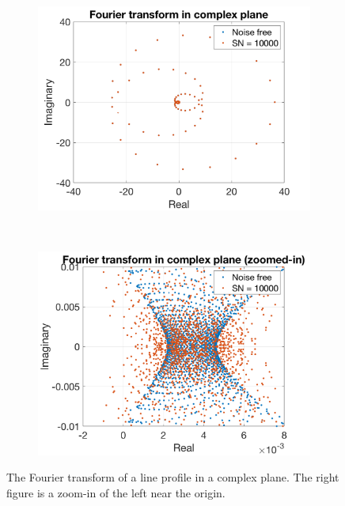 \begin{figure}[tbp]	
    \begin{subfigure}[b]{0.49\textwidth}
        \includegraphics[width=\textwidth]{./Figures/Methods/7-Phase_angle_in_complex_plane_1.png}
        \label{fig:FT_compelx_plane_1}
    \end{subfigure}
	~
    \begin{subfigure}[b]{0.49\textwidth}
        \includegraphics[width=\textwidth]{./Figures/Methods/7-Phase_angle_in_complex_plane_2.png}
        \label{fig:FT_compelx_plane_2}
    \end{subfigure}	
    
    \caption[Fourier transform of a line profile in a complex plane]
    {The Fourier transform of a line profile in a complex plane. The right figure is a zoom-in of the left near the origin.}
\label{fig:FT_compelx_plane}
\end{figure}    
\FloatBarrier

